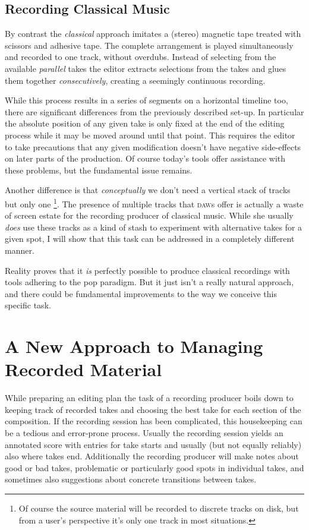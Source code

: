 \documentclass[11pt,a4paper]{article}
\begin{document}
\subsection{Recording Classical Music}
 
By contrast the \emph{classical} approach imitates a (stereo) magnetic tape
treated with scissors and adhesive tape.
The complete arrangement is played simultaneously and recorded to one track,
without overdubs.
Instead of selecting from the available \emph{parallel} takes the editor
extracts selections from the takes and glues them together \emph{consecutively},
creating a seemingly continuous recording.

While this process results in a series of segments on a horizontal timeline too,
there are significant differences from the previously described set-up.
In particular the absolute position of any given take is only fixed at
the end of the editing process while it may be moved around until that point.
This requires the editor to take precautions that any given modification
doesn't have negative side-effects on later parts of the production.
Of course today's tools offer assistance with these problems, but the fundamental
issue remains.

Another difference is that \emph{conceptually} we don't need a vertical stack of
tracks but only one%
\footnote{Of course the source material will be recorded to discrete tracks on
disk, but from a user's perspective it's only one track in most situations.}.
The presence of multiple tracks that \textsc{daw}s offer is actually a waste of
screen estate for the recording producer of classical music.
While she usually \emph{does} use these tracks as a kind of stash to experiment
with alternative takes for a given spot, I will show that this task can be
addressed in a completely different manner.

Reality proves that it \emph{is} perfectly possible to produce classical
recordings with tools adhering to the pop paradigm.
But it just isn't a really natural approach, and there could be fundamental
improvements to the way we conceive this specific task. 

\section{A New Approach to Managing Recorded Material}

While preparing an editing plan the task of a recording producer boils down to
keeping track of recorded takes and choosing the best take for each section of
the composition.
If the recording session has been complicated, this housekeeping can be a
tedious and error-prone process.
Usually the recording session yields an annotated score with entries for take
starts and usually (but not equally reliably) also where takes end.
Additionally the recording producer will make notes about good or bad takes,
problematic or particularly good spots in individual takes, and sometimes also
suggestions about concrete transitions between takes.
\end{document}
